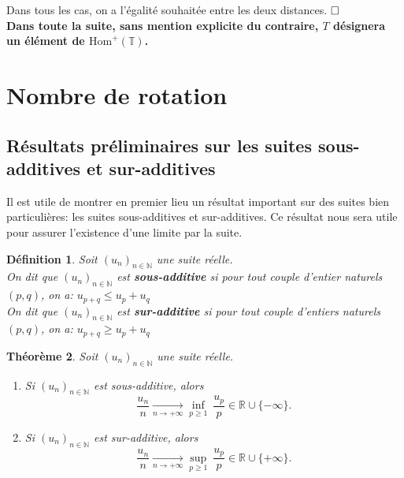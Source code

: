 \documentclass[11pt,a4 paper]{article}
\newtheorem{theoreme}{Théorème}[section]
\newtheorem{definition}[theoreme]{Définition}
\newcommand{\Tbb}{\mathbb{T}}
\newenvironment{thm}{\begin{box_thm}\begin{theoreme}}{\end{theoreme}\end{box_thm}}
\newenvironment{defi}{\begin{box_defi}\begin{definition}}{\end{definition}\end{box_defi}}
\begin{document}
	\par Dans tous les cas, on a l'égalité souhaitée entre les deux distances.
	 $\hfill \square$\\



\textbf{Dans toute la suite, sans mention explicite du contraire, $T$ désignera un élément de $\mathrm{Hom}^+(\Tbb)$.}


















\newpage
\section{Nombre de rotation}

\subsection{Résultats préliminaires sur les suites sous-additives et sur-additives}
Il est utile de montrer en premier lieu un résultat important sur des suites bien particulières: les suites sous-additives et sur-additives. Ce résultat nous sera utile pour assurer l'existence d'une limite par la suite.


\begin{defi}
	Soit $(u_n)_{n \in \mathbb{N}}$ une suite réelle.\\ On dit que $(u_n)_{n \in \mathbb{N}}$ est \textbf{sous-additive} si pour tout couple d'entier naturels $(p,q)$, on a: $u_{p+q} \leq u_p + u_q$\\
	On dit que $(u_n)_{n \in \mathbb{N}}$ est \textbf{sur-additive} si pour tout couple d'entiers naturels $(p, q)$, on a: $u_{p+q} \geq u_p + u_q$
\end{defi}



\begin{thm}\label{suiteadd} Soit $(u_n)_{n \in \mathbb{N}}$ une suite réelle.
	\begin{enumerate}
		\item Si $(u_n)_{n \in \mathbb{N}}$ est sous-additive, alors
		$$\frac{u_n}{n} \underset{n \to + \infty}{\longrightarrow} \underset{p \geq 1}{\inf}\  \frac{u_p}{p} \in \mathbb{R} \cup \lbrace - \infty \rbrace.$$
		
		\item Si $(u_n)_{n \in \mathbb{N}}$ est sur-additive, alors 
		$$\frac{u_n}{n} \underset{n \to + \infty}{\longrightarrow} \underset{p \geq 1}{\sup}\  \frac{u_p}{p}  \in \mathbb{R} \cup \lbrace + \infty \rbrace.$$
	\end{enumerate} 
\end{thm}
\end{document}
